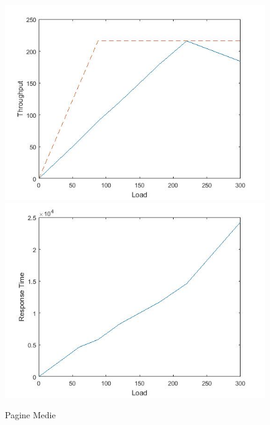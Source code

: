 		\begin{figure}[H]
			\centering
			\includegraphics[scale=0.6]{./immagine/mediaT.jpg}
			\includegraphics[scale=0.6]{./immagine/mediaR.jpg}
			\caption{Pagine Medie}
			\label{fig:ct-m}
		\end{figure}

